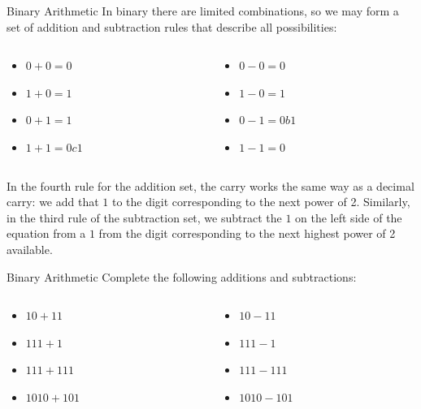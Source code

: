 \documentclass{beamer}
\begin{document}
\begin{frame}{Binary Arithmetic}
In binary there are limited combinations, so we may form a set of addition and subtraction rules that describe all possibilities: \\ \vspace{0.5cm}
\hrulefill
\begin{columns}[T]
\begin{column}{0.5\textwidth}
\begin{itemize}
\item $0+0=0$
\item $1+0=1$
\item $0+1=1$
\item $1+1 = 0 c 1$
\end{itemize}
\end{column}
\begin{column}{0.5\textwidth}
\begin{itemize}
\item $0-0=0$
\item $1-0=1$
\item $0-1=0b1$
\item $1-1 = 0$
\end{itemize}
\end{column}
\end{columns}
\tiny
In the fourth rule for the addition set, the carry works the same way as a decimal carry: we add that $1$ to the digit corresponding to the next power of 2.  Similarly, in the third rule of the subtraction set, we subtract the $1$ on the left side of the equation from a $1$ from the digit corresponding to the next highest power of 2 available.
\end{frame}

\begin{frame}{Binary Arithmetic}
Complete the following additions and subtractions: \\ \vspace{0.5cm}
\hrulefill
\begin{columns}[T]
\begin{column}{0.5\textwidth}
\begin{itemize}
\item $10+11$
\item $111+1$
\item $111+111$
\item $1010+101$
\end{itemize}
\end{column}
\begin{column}{0.5\textwidth}
\begin{itemize}
\item $10-11$
\item $111-1$
\item $111-111$
\item $1010-101$
\end{itemize}
\end{column}
\end{columns}
\end{frame}
\end{document}
